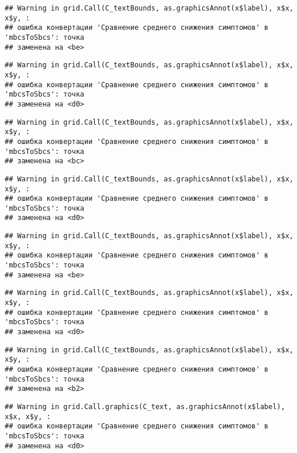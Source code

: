 \documentclass[
]{article}
\begin{document}
\begin{verbatim}
## Warning in grid.Call(C_textBounds, as.graphicsAnnot(x$label), x$x, x$y, :
## ошибка конвертации 'Сравнение среднего снижения симптомов' в 'mbcsToSbcs': точка
## заменена на <be>
\end{verbatim}

\begin{verbatim}
## Warning in grid.Call(C_textBounds, as.graphicsAnnot(x$label), x$x, x$y, :
## ошибка конвертации 'Сравнение среднего снижения симптомов' в 'mbcsToSbcs': точка
## заменена на <d0>
\end{verbatim}

\begin{verbatim}
## Warning in grid.Call(C_textBounds, as.graphicsAnnot(x$label), x$x, x$y, :
## ошибка конвертации 'Сравнение среднего снижения симптомов' в 'mbcsToSbcs': точка
## заменена на <bc>
\end{verbatim}

\begin{verbatim}
## Warning in grid.Call(C_textBounds, as.graphicsAnnot(x$label), x$x, x$y, :
## ошибка конвертации 'Сравнение среднего снижения симптомов' в 'mbcsToSbcs': точка
## заменена на <d0>
\end{verbatim}

\begin{verbatim}
## Warning in grid.Call(C_textBounds, as.graphicsAnnot(x$label), x$x, x$y, :
## ошибка конвертации 'Сравнение среднего снижения симптомов' в 'mbcsToSbcs': точка
## заменена на <be>
\end{verbatim}

\begin{verbatim}
## Warning in grid.Call(C_textBounds, as.graphicsAnnot(x$label), x$x, x$y, :
## ошибка конвертации 'Сравнение среднего снижения симптомов' в 'mbcsToSbcs': точка
## заменена на <d0>
\end{verbatim}

\begin{verbatim}
## Warning in grid.Call(C_textBounds, as.graphicsAnnot(x$label), x$x, x$y, :
## ошибка конвертации 'Сравнение среднего снижения симптомов' в 'mbcsToSbcs': точка
## заменена на <b2>
\end{verbatim}

\begin{verbatim}
## Warning in grid.Call.graphics(C_text, as.graphicsAnnot(x$label), x$x, x$y, :
## ошибка конвертации 'Сравнение среднего снижения симптомов' в 'mbcsToSbcs': точка
## заменена на <d0>
\end{verbatim}
\end{document}
